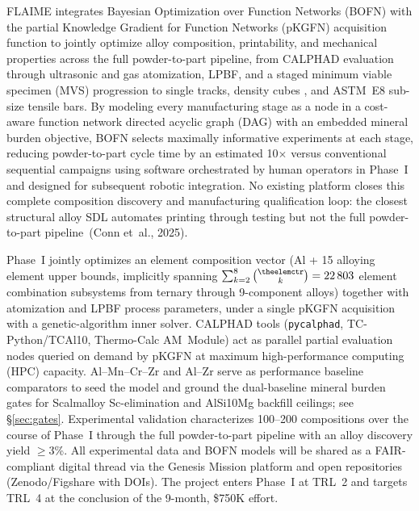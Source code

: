 \documentclass[11pt,letterpaper]{article}
\newcommand{\kmin}{2}                    %
\newcommand{\kmax}{8}                    %
\newcounter{elemctr}
\newcommand{\elementcount}{\theelemctr}  %
\newcommand{\subsystemcount}{22\,803}    %
\begin{document}
FLAIME integrates Bayesian Optimization over Function Networks (BOFN) with
the partial Knowledge Gradient for Function Networks (pKGFN) acquisition
function to jointly optimize alloy composition, printability, and mechanical
properties across the full powder-to-part pipeline, from CALPHAD evaluation
through ultrasonic and gas atomization, LPBF,
and a staged minimum viable specimen (MVS) progression to single tracks,
density cubes
, and ASTM~E8 sub-size
tensile bars. By modeling every manufacturing stage as a node in
a cost-aware function network directed acyclic graph (DAG) with an embedded mineral burden objective,
BOFN selects maximally informative experiments at each stage, reducing
powder-to-part cycle time by an estimated 10$\times$ versus conventional
sequential campaigns
using software orchestrated by human operators in Phase~I and
designed for subsequent robotic integration.  No existing
platform closes this complete composition discovery and
manufacturing qualification loop: the closest structural alloy SDL
automates printing through testing but not the full
powder-to-part pipeline~(Conn et~al., 2025).

Phase~I jointly optimizes an element composition vector (Al + 15 alloying element
upper bounds, implicitly spanning $\sum\nolimits_{k=2}^{8}\tbinom{\elementcount}{k}=\subsystemcount{}$
element combination subsystems from ternary through 9-component alloys)
together with atomization and LPBF process parameters, under a single pKGFN
acquisition with a genetic-algorithm inner solver. CALPHAD tools
(\texttt{pycalphad}, TC-Python/TCAl10, Thermo-Calc AM~Module) act as
parallel
partial evaluation nodes queried on demand by
pKGFN at maximum high-performance computing (HPC) capacity.
Al--Mn--Cr--Zr and Al--Zr serve as performance
baseline comparators to seed the model and ground the dual-baseline
mineral burden gates for
Scalmalloy Sc-elimination and AlSi10Mg backfill
ceilings; see \S\ref{sec:gates}. Experimental validation characterizes 100--200 compositions over the course of Phase~I
through
the full powder-to-part pipeline with an alloy discovery yield $\geq$3\%.
All
experimental data and BOFN models will be shared as a FAIR-compliant
digital thread via the Genesis Mission platform and open repositories
(Zenodo/Figshare with DOIs). The project enters Phase~I at
TRL~2
and targets TRL~4
at the conclusion of the 9-month, \$750K effort.
\end{document}
